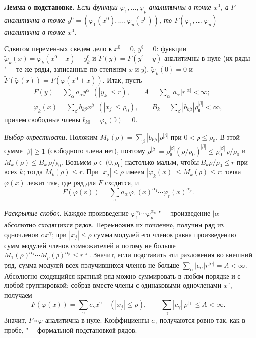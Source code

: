 \begin{solution}[2 (\S\,5)]
\textbf{Лемма о подстановке.} \emph{Если функции $\varphi_1,\dots,\varphi_p$
аналитичны в точке $x^0$, а $F$ аналитична в точке
$y^0=(\varphi_1(x^0),\dots,\varphi_p(x^0))$, то $F(\varphi_1,\dots,\varphi_p)$
аналитична в точке $x^0$.}

Сдвигом переменных сведем дело к $x^0=0$, $y^0=0$: функции
$\tilde\varphi_k(x)=\varphi_k(x^0+x)-y^0_k$ и $\tilde F(y)=F(y^0+y)$
аналитичны в нуле (их ряды "--- те же ряды, записанные по степеням $x$ и $y$),
$\tilde\varphi_k(0)=0$ и $\tilde F(\tilde\varphi(x))=F(\varphi(x^0+x))$.
Итак, пусть
\begin{gather*}
F(y)=\sum_\alpha a_\alpha y^\alpha\ \ (|y_k|\le r),\qquad A=\sum_\alpha|a_\alpha|r^{|\alpha|}<\infty;\\
\varphi_k(x)=\sum_\beta b_{k\beta}x^\beta\ \ (|x_j|\le\rho_0),\qquad B_k=\sum_\beta|b_{k\beta}|\rho_0^{|\beta|}<\infty,
\end{gather*}
причем свободные члены $b_{k0}=\varphi_k(0)=0$.

\emph{Выбор окрестности.} Положим $M_k(\rho)=\sum_\beta|b_{k\beta}|\rho^{|\beta|}$
при $0<\rho\le\rho_0$. В этой сумме $|\beta|\ge1$ (свободного члена нет),
поэтому $\rho^{|\beta|}=\rho_0^{|\beta|}(\rho/\rho_0)^{|\beta|}\le\rho_0^{|\beta|}\,\rho/\rho_0$
и $M_k(\rho)\le B_k\,\rho/\rho_0$. Возьмем $\rho\in(0,\rho_0]$ настолько
малым, чтобы $B_k\rho/\rho_0\le r$ при всех $k$; тогда $M_k(\rho)\le r$. При
$|x_j|\le\rho$ имеем $|\varphi_k(x)|\le M_k(\rho)\le r$: точка $\varphi(x)$
лежит там, где ряд для $F$ сходится, и
\[
F(\varphi(x))=\sum_\alpha a_\alpha\,\varphi_1(x)^{\alpha_1}\cdots\varphi_p(x)^{\alpha_p}.
\]

\emph{Раскрытие скобок.} Каждое произведение
$\varphi_1^{\alpha_1}\cdots\varphi_p^{\alpha_p}$ "--- произведение $|\alpha|$
абсолютно сходящихся рядов. Перемножив их почленно, получим ряд из
одночленов $c\,x^\gamma$; при $|x_j|\le\rho$ сумма модулей его членов
равна произведению сумм модулей членов сомножителей и потому не больше
$M_1(\rho)^{\alpha_1}\cdots M_p(\rho)^{\alpha_p}\le r^{|\alpha|}$.
Значит, если подставить эти разложения во внешний ряд, сумма модулей всех
получившихся членов не больше $\sum_\alpha|a_\alpha|r^{|\alpha|}=A<\infty$.
Абсолютно сходящийся кратный ряд можно суммировать в любом порядке и с любой
группировкой; собрав вместе члены с одинаковыми одночленами $x^\gamma$,
получаем
\[
F(\varphi(x))=\sum_\gamma c_\gamma x^\gamma\quad(|x_j|\le\rho),\qquad
\sum_\gamma|c_\gamma|\,\rho^{|\gamma|}\le A<\infty .
\]
Значит, $F\circ\varphi$ аналитична в нуле. Коэффициенты $c_\gamma$
получаются ровно так, как в пробе, "--- формальной подстановкой рядов.


\end{solution}
